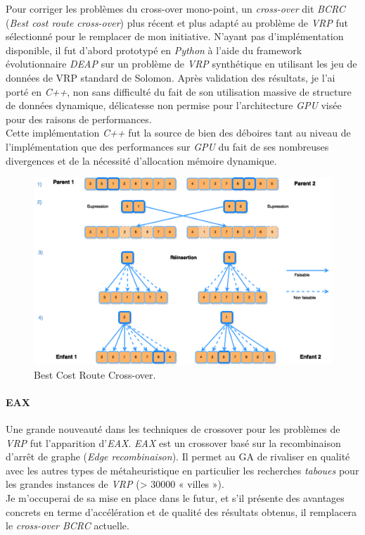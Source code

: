 \documentclass[french, 11pt]{memoir}
\begin{document}
Pour corriger les problèmes du cross-over mono-point, un
\emph{cross-over} dit \textit{BCRC\cite{ombuki2006multi}} (\emph{Best cost route cross-over}) plus
récent et plus adapté au problème de \textit{ VRP} fut sélectionné pour le
remplacer de mon initiative. N'ayant pas d'implémentation disponible, il
fut d'abord prototypé en \textit{Python} à l'aide du framework évolutionnaire
\emph{DEAP} sur un problème de \emph{VRP} synthétique en utilisant les
jeu de données de VRP standard de Solomon\cite{solomon1987algorithms}. Après validation des
résultats, je l'ai porté en \textit{C++}, non sans difficulté du fait de
son utilisation massive de structure de données dynamique, délicatesse
non permise pour l'architecture \textit{GPU} visée pour des raisons de
performances. \\
Cette implémentation \emph{C++} fut la source de bien des
déboires tant au niveau de l'implémentation que des performances sur
\textit{GPU} du fait de ses nombreuses divergences et de la nécessité
d'allocation mémoire dynamique.

\begin{figure}[htbp]
	\begin{center}
		\includegraphics[width=6in]{img/BCRC.png}
		\caption{Best Cost Route Cross-over.}
	\end{center}
\end{figure}

\paragraph{EAX}\label{eax}

Une grande nouveauté dans les techniques de crossover pour les problèmes
de \emph{VRP} fut l'apparition d'\emph{EAX\cite{nagata2006new}}. \emph{EAX} est un crossover
basé sur la recombinaison d'arrêt de graphe (\emph{Edge recombinaison}).
Il permet au GA de rivaliser en qualité avec les autres types de
métaheuristique en particulier les recherches \emph{taboues} pour les
grandes instances de \emph{VRP} (\textgreater{} 30000 « villes »). \\
 Je
m'occuperai de sa mise en place dans le futur, et s'il présente des
avantages concrets en terme d'accélération et de qualité des résultats
obtenus, il remplacera le \emph{cross-over BCRC} actuelle.
\end{document}
